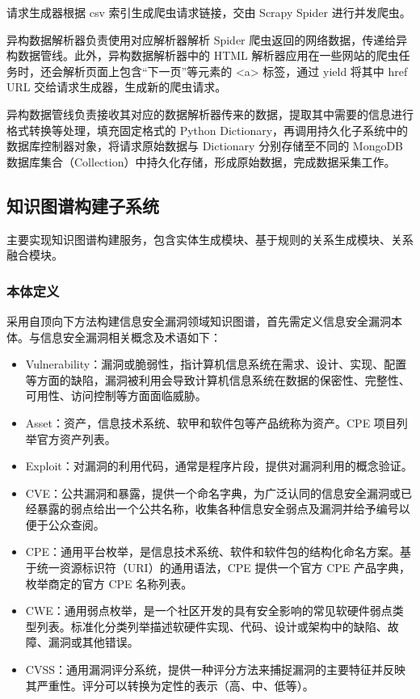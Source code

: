 \documentclass[a4paper,AutoFakeBold,oneside,12pt]{book}
\begin{document}
请求生成器根据 csv 索引生成爬虫请求链接，交由 Scrapy Spider 进行并发爬虫。

异构数据解析器负责使用对应解析器解析 Spider 爬虫返回的网络数据，传递给异构数据管线。此外，异构数据解析器中的 HTML 解析器应用在一些网站的爬虫任务时，还会解析页面上包含“下一页”等元素的 <a> 标签，通过 yield 将其中 href URL 交给请求生成器，生成新的爬虫请求。

异构数据管线负责接收其对应的数据解析器传来的数据，提取其中需要的信息进行格式转换等处理，填充固定格式的 Python Dictionary，再调用持久化子系统中的数据库控制器对象，将请求原始数据与 Dictionary 分别存储至不同的 MongoDB 数据库集合（Collection）中持久化存储，形成原始数据，完成数据采集工作。

\subsection{知识图谱构建子系统\label{知识图谱构建子系统}}

主要实现知识图谱构建服务，包含实体生成模块、基于规则的关系生成模块、关系融合模块。

\subsubsection{本体定义}

采用自顶向下方法构建信息安全漏洞领域知识图谱，首先需定义信息安全漏洞本体。与信息安全漏洞相关概念及术语如下：
\begin{itemize}
	\item Vulnerability：漏洞或脆弱性，指计算机信息系统在需求、设计、实现、配置等方面的缺陷，漏洞被利用会导致计算机信息系统在数据的保密性、完整性、可用性、访问控制等方面面临威胁。\cite{cnnvd_vul_category}
	\item Asset：资产，信息技术系统、软甲和软件包等产品统称为资产。CPE 项目列举官方资产列表。
	\item Exploit：对漏洞的利用代码，通常是程序片段，提供对漏洞利用的概念验证。
	\item CVE：公共漏洞和暴露，提供一个命名字典，为广泛认同的信息安全漏洞或已经暴露的弱点给出一个公共名称，收集各种信息安全弱点及漏洞并给予编号以便于公众查阅。\cite{cve_intro}
	\item CPE：通用平台枚举，是信息技术系统、软件和软件包的结构化命名方案。基于统一资源标识符（URI）的通用语法，CPE 提供一个官方 CPE 产品字典，枚举商定的官方 CPE 名称列表。\cite{cpe_intro}
	\item CWE：通用弱点枚举，是一个社区开发的具有安全影响的常见软硬件弱点类型列表。标准化分类列举描述软硬件实现、代码、设计或架构中的缺陷、故障、漏洞或其他错误。\cite{cwe_intro}
	\item CVSS：通用漏洞评分系统，提供一种评分方法来捕捉漏洞的主要特征并反映其严重性。评分可以转换为定性的表示（高、中、低等）。\cite{cvss_intro}
\end{itemize}
\end{document}
